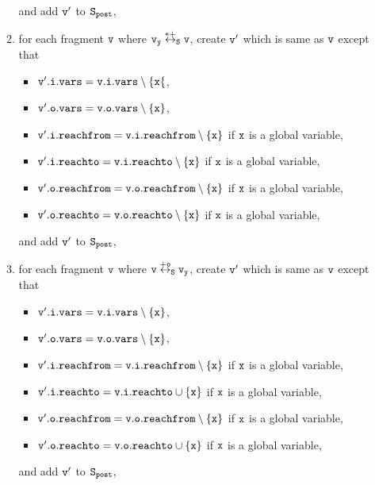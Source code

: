 \begin{itemize}
\begin{enumerate}
\begin{itemize}
\end{itemize}
and add $\tt v'$ to $\tt S_{post}$,
\item for each fragment $\tt v$ where $\tt v_y \overset{*+}\leftrightarrow_S v$, create $\tt v'$ which is same as $\tt v$ except that 
\begin{itemize}
\item $\tt v'.i.vars = v.i.vars \setminus \{x\{$,
\item $\tt v'.o.vars = v.o.vars \setminus \{x\}$,
\item $\tt v'.i.reachfrom = v.i.reachfrom \setminus \{x\}$ if $\tt x$ is a global variable,
\item $\tt v'.i.reachto = v.i.reachto \setminus \{x\}$ if $\tt x$ is a global variable,
\item $\tt v'.o.reachfrom = v.o.reachfrom \setminus \{x\}$ if $\tt x$ is a global variable,
\item $\tt v'.o.reachto = v.o.reachto \setminus \{x\}$ if $\tt x$ is a global variable,
\end{itemize}
and add $\tt v'$ to $\tt S_{post}$,
\item for each fragment $\tt v$ where $\tt v \overset{+o}\leftrightarrow_S v_y$, create $\tt v'$ which is same as $\tt v$ except that 
\begin{itemize}
\item $\tt v'.i.vars = v.i.vars \setminus \{x\}$,
\item $\tt v'.o.vars = v.o.vars \setminus \{x\}$,
\item $\tt v'.i.reachfrom = v.i.reachfrom \setminus \{x\}$ if $\tt x$ is a global variable,
\item $\tt v'.i.reachto = v.i.reachto \cup \{x\}$ if $\tt x$ is a global variable,
 \item $\tt v'.o.reachfrom = v.o.reachfrom \setminus \{x\}$ if $\tt x$ is a global variable,
 \item $\tt v'.o.reachto = v.o.reachto \cup \{x\}$ if $\tt x$ is a global variable,
\end{itemize}
and add $\tt v'$ to $\tt S_{post}$,


\end{enumerate}
\end{itemize}
